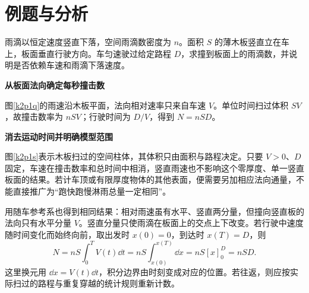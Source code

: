 \section{例题与分析}
\begin{question}\begin{example}[行车中竖直木板的淋雨量]\label{k2p1}
雨滴以恒定速度竖直下落，空间雨滴数密度为 $n$。面积 $S$ 的薄木板竖直立在车上，板面垂直行驶方向。车匀速驶过给定路程 $D$，求撞到板面上的雨滴数，并说明是否依赖车速和雨滴下落速度。\end{example}
\end{question}
\begin{solution}\textbf{从板面法向确定每秒撞击数}\par\nobreak
图\ref{k2p1q}的雨速沿木板平面，法向相对速率只来自车速 $V$。单位时间扫过体积 $SV$，故撞击数率为 $nSV$；行驶时间为 $D/V$，得到 $\boxed{N=nSD}$。



\par\medskip{}\noindent\textbf{消去运动时间并明确模型范围}\par\nobreak
图\ref{k2p1s}表示木板扫过的空间柱体，其体积只由面积与路程决定。只要 $V>0$、$D$固定，车速在撞击数率和总时间中相消，竖直雨速也不影响这个零厚度、单一竖直板面的结果。若计车顶或有限厚度物体的其他表面，便需要另加相应法向通量，不能直接推广为“跑快跑慢淋雨总量一定相同”。

用随车参考系也得到相同结果：相对雨速虽有水平、竖直两分量，但撞向竖直板的法向只有水平分量 $V$。竖直分量只使雨滴在板面上的交点上下改变。若行驶中速度随时间变化而始终向前，取出发时 $x(0)=0$，到达时 $x(T)=D$，则
\[
 N=nS\int_0^T V(t)\dd t
 =nS\int_{x(0)}^{x(T)}\dd x
 =nS[x]_0^D=nSD.
\]
这里换元用 $\dd x=V(t)\dd t$，积分边界由时刻变成对应的位置。若往返，则应按实际扫过的路程与重复穿越的统计规则重新计数。\end{solution}

